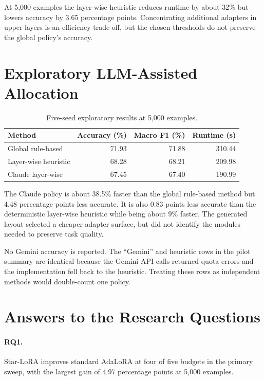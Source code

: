 At 5,000 examples the layer-wise heuristic reduces runtime by about 32\% but lowers accuracy by
3.65 percentage points. Concentrating additional adapters in upper layers is an efficiency
trade-off, but the chosen thresholds do not preserve the global policy's accuracy.

\section{Exploratory LLM-Assisted Allocation}

\begin{table}[H]
\centering
\caption{Five-seed exploratory results at 5,000 examples.}
\label{tab:llm}
\begin{tabular}{@{}lrrr@{}}
\toprule
Method & Accuracy (\%) & Macro F1 (\%) & Runtime (s) \\
\midrule
Global rule-based & 71.93 & 71.88 & 310.44 \\
Layer-wise heuristic & 68.28 & 68.21 & 209.98 \\
Claude layer-wise & 67.45 & 67.40 & 190.99 \\
\bottomrule
\end{tabular}
\end{table}

The Claude policy is about 38.5\% faster than the global rule-based method but 4.48 percentage
points less accurate. It is also 0.83 points less accurate than the deterministic layer-wise
heuristic while being about 9\% faster. The generated layout selected a cheaper adapter surface,
but did not identify the modules needed to preserve task quality.

No Gemini accuracy is reported. The ``Gemini'' and heuristic rows in the pilot summary are
identical because the Gemini API calls returned quota errors and the implementation fell back to
the heuristic. Treating these rows as independent methods would double-count one policy.

\section{Answers to the Research Questions}

\paragraph{RQ1.}
Star-LoRA improves standard AdaLoRA at four of five budgets in the primary sweep, with the largest
gain of 4.97 percentage points at 5,000 examples.

